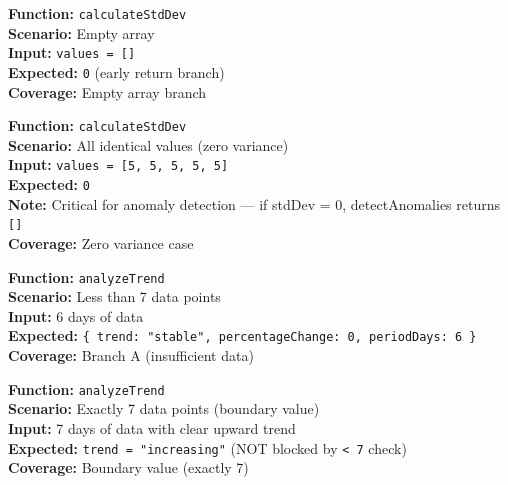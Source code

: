 \documentclass[12pt,a4paper]{report}
\newcommand{\pone}{\textbf{\color{p1red}P1}}
\begin{document}
\begin{tcolorbox}[testbox, title={FORE-004 \hfill \pone}]
\textbf{Function:} \texttt{calculateStdDev} \\
\textbf{Scenario:} Empty array \\
\textbf{Input:} \texttt{values = []} \\
\textbf{Expected:} \texttt{0} (early return branch) \\
\textbf{Coverage:} Empty array branch
\end{tcolorbox}

\begin{tcolorbox}[criticalbox, title={FORE-005 \hfill \pone\ --- Zero Variance}]
\textbf{Function:} \texttt{calculateStdDev} \\
\textbf{Scenario:} All identical values (zero variance) \\
\textbf{Input:} \texttt{values = [5, 5, 5, 5, 5]} \\
\textbf{Expected:} \texttt{0} \\
\textbf{Note:} Critical for anomaly detection --- if stdDev = 0, detectAnomalies returns \texttt{[]} \\
\textbf{Coverage:} Zero variance case
\end{tcolorbox}

\begin{tcolorbox}[testbox, title={FORE-007 \hfill \pone}]
\textbf{Function:} \texttt{analyzeTrend} \\
\textbf{Scenario:} Less than 7 data points \\
\textbf{Input:} 6 days of data \\
\textbf{Expected:} \texttt{\{ trend: "stable", percentageChange: 0, periodDays: 6 \}} \\
\textbf{Coverage:} Branch A (insufficient data)
\end{tcolorbox}

\begin{tcolorbox}[testbox, title={FORE-008 \hfill \pone\ --- Boundary}]
\textbf{Function:} \texttt{analyzeTrend} \\
\textbf{Scenario:} Exactly 7 data points (boundary value) \\
\textbf{Input:} 7 days of data with clear upward trend \\
\textbf{Expected:} \texttt{trend = "increasing"} (NOT blocked by \texttt{< 7} check) \\
\textbf{Coverage:} Boundary value (exactly 7)
\end{tcolorbox}
\end{document}
